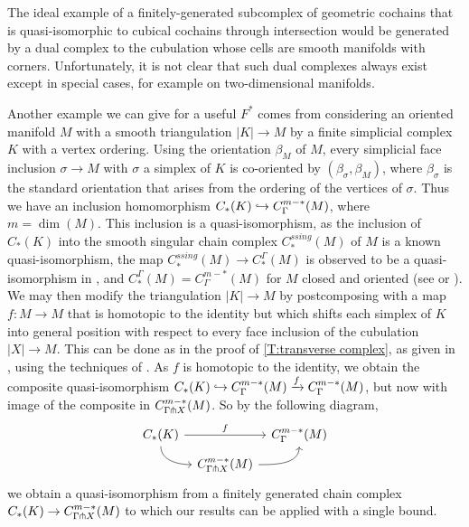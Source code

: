 The ideal example of a finitely-generated subcomplex of geometric cochains that is quasi-isomorphic to cubical cochains through intersection
would be generated by a dual complex to the cubulation whose cells are smooth manifolds with corners.
Unfortunately, it is not clear that such dual complexes always exist except in special cases, for example on two-dimensional manifolds.

Another example we can give for a useful $F^*$ comes from considering an oriented manifold $M$ with a smooth triangulation $|K|\to M$ by a finite simplicial complex $K$ with a vertex ordering.
Using the orientation $\beta_M$ of $M$, every simplicial face inclusion $\sigma\to M$ with $\sigma$ a simplex of $K$ is co-oriented by $(\beta_\sigma,\beta_M)$, where $\beta_\sigma$ is the standard orientation that arises from the ordering of the vertices of $\sigma$.
Thus we have an inclusion homomorphism $C_*(K)\hookrightarrow C^{m-*}_\Gamma(M)$, where $m = \dim(M)$.
This inclusion is a quasi-isomorphism, as the inclusion of $C_*(K)$ into the smooth singular chain complex $C_*^{ssing}(M)$ of $M$ is a known quasi-isomorphism, the map $C_*^{ssing}(M) \to C_*^\Gamma(M)$ is observed to be a quasi-isomorphism in \cite[Section 10]{Lipy14}, and $C_*^\Gamma(M)=C^{m-*}_\Gamma(M)$ for $M$ closed and oriented (see \cite[Section 12]{Lipy14} or \cite[Theorem 4.21]{medina2022foundations}).
We may then modify the triangulation $|K|\to M$ by postcomposing with a map $f \colon M\to M$ that is homotopic to the identity but which shifts each simplex of $K$ into general position with respect to every face inclusion of the cubulation $|X|\to M$.
This can be done as in the proof of \cref{T:transverse complex}, as given in \cite[Theorem 6.5]{medina2022foundations}, using the techniques of \cite[Section 2.3]{GuPo74}.
As $f$ is homotopic to the identity, we obtain the composite quasi-isomorphism $C_*(K)\hookrightarrow C^{m-*}_\Gamma(M) \xrightarrow{f} C^{m-*}_\Gamma(M)$, but now with image of the composite in $C^{m-*}_{\Gamma \pitchfork X}(M)$.
So by the following diagram,
\begin{equation*}
	\begin{tikzcd}[column sep=tiny, row sep=tiny]
		C_*(K) \arrow[rr, "f"] \arrow[dr, out=-90, in=180]& & C^{m-*}_{\Gamma}(M) \\
		& C^{m-*}_{\Gamma \pf X}(M) \arrow[ur, out=0, in =-90] &
	\end{tikzcd}
\end{equation*}
we obtain a quasi-isomorphism from a finitely generated chain complex $C_*(K) \to C^{m-*}_{\Gamma \pitchfork X}(M)$ to which our results can be applied with a single bound.

